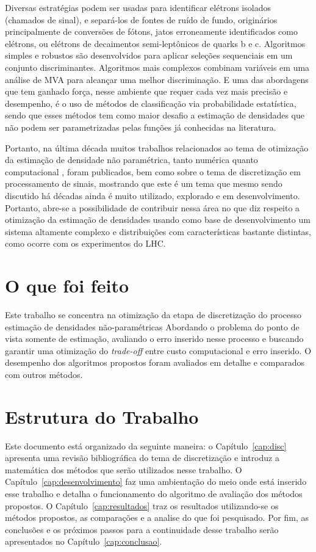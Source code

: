 Diversas estratégias podem ser usadas para identificar elétrons isolados (chamados de sinal), e separá-los de fontes de ruído de fundo, originários principalmente de conversões de fótons, jatos erroneamente identificados como elétrons, ou elétrons de decaimentos semi-leptônicos de quarks b e c. Algoritmos simples e robustos são desenvolvidos para aplicar seleções sequenciais em um conjunto discriminantes. Algoritmos mais complexos combinam variáveis em uma análise de \ac{MVA} para alcançar uma melhor discriminação. E uma das abordagens que tem ganhado força, nesse ambiente que requer cada vez mais precisão e desempenho, é o uso de métodos de classificação via probabilidade estatística, sendo que esses métodos tem como maior desafio a estimação de densidades que não podem ser parametrizadas pelas funções já conhecidas na literatura.

Portanto, na última década muitos trabalhos relacionados ao tema de otimização da estimação de densidade não paramétrica, tanto numérica \cite{schindler2012bandwidth} quanto computacional \cite{gramacki2017nonparametric}, foram publicados, bem como sobre o tema de discretização em processamento de sinais, mostrando que este é um tema que mesmo sendo discutido há décadas ainda é muito utilizado, explorado e em desenvolvimento. Portanto, abre-se a possibilidade de contribuir nessa área no que diz respeito a otimização da estimação de densidades usando como base de desenvolvimento um sistema altamente complexo e distribuições com características bastante distintas, como ocorre com os experimentos do \ac{LHC}. 

\section{O que foi feito}

Este trabalho se concentra na otimização da etapa de discretização do processo estimação de densidades não-paramétricas Abordando o problema do ponto de vista somente de estimação, avaliando o erro inserido nesse processo e buscando garantir uma otimização do \textit{trade-off} entre custo computacional e erro inserido. O desempenho dos algoritmos propostos foram avaliados em detalhe e comparados com outros métodos.

\section{Estrutura do Trabalho}

Este documento está organizado da seguinte maneira: o Capítulo~\ref{cap:disc} apresenta uma revisão bibliográfica do tema de discretização e introduz a matemática dos métodos que serão utilizados nesse trabalho. O Capítulo~\ref{cap:desenvolvimento} faz uma ambientação do meio onde está inserido esse trabalho e detalha o funcionamento do algoritmo de avaliação dos métodos propostos. O Capítulo~\ref{cap:resultados} traz os resultados utilizando-se os métodos propostos, as comparações e a analise do que foi pesquisado. Por fim, as conclusões e os próximos passos para a continuidade desse trabalho serão apresentados no Capítulo~\ref{cap:conclusao}.

